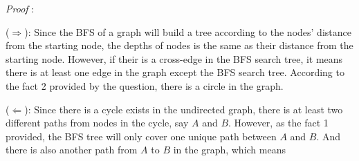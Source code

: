 \documentclass[11pt]{article}
\begin{document}
\noindent\emph{Proof} : 

($\Longrightarrow$): Since the BFS of a graph will build a tree according to the nodes' distance from the starting node, the depths of nodes is the same as their distance from the starting node. However, if their is a cross-edge in the BFS search tree, it means there is at least one edge in the graph except the BFS search tree. According to the fact 2 provided by the question, there is a circle in the graph.

($\Longleftarrow$): Since there is a cycle exists in the undirected graph, there is at least two different paths from nodes in the cycle, say $A$ and $B$. However, as the fact 1 provided, the BFS tree will only cover one unique path between $A$ and $B$. And there is also another path from $A$ to $B$ in the graph, which means 
\end{document}
